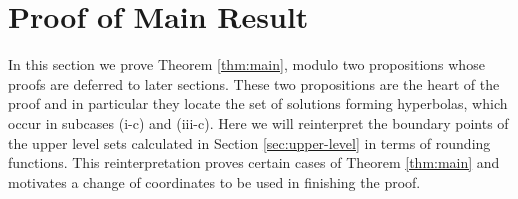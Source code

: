 \documentclass[12pt,letterpaper, reqno]{amsart}
\theoremstyle{definition}
\theoremstyle{remark}
\begin{document}
\section{Proof  of Main Result}\label{sec:rounding}
\setcounter{equation}{0}


In this section we prove  Theorem \ref{thm:main}, modulo two propositions whose proofs are deferred to later sections.
These two propositions are the heart of the proof and  in particular they locate the set of solutions forming hyperbolas, which occur in subcases (i-c) and (iii-c). 
Here we will reinterpret the boundary points of the upper level sets calculated in Section \ref{sec:upper-level}  in terms of rounding functions.
This reinterpretation proves certain cases of Theorem \ref{thm:main} and motivates a change of coordinates to be used in finishing the proof.


\end{document}
